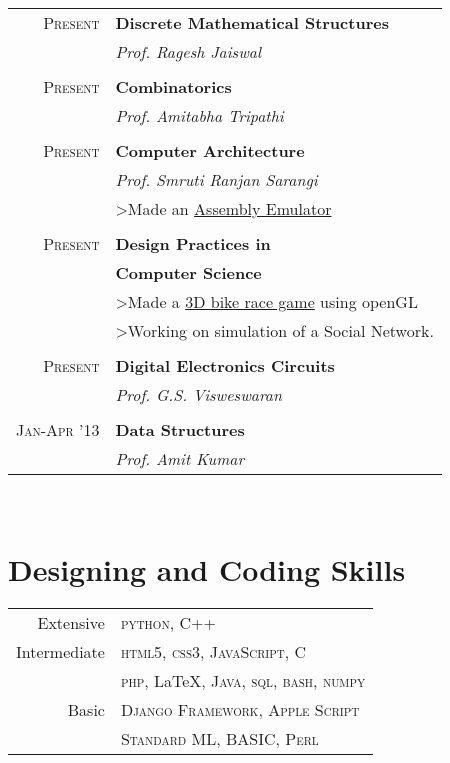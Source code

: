 \documentclass[10pt]{article} %
\begin{document}
{\begin{minipage}[t]{0.44\textwidth}
\begin{tabular}{rl}
\textsc{Present} & \textbf{Discrete Mathematical Structures}\\
& \textit{Prof. Ragesh Jaiswal}\\\\
\textsc{Present} & \textbf{Combinatorics}\\
& \textit{Prof. Amitabha Tripathi}\\\\
 \textsc{Present} & \textbf{Computer Architecture}\\
& \textit{Prof. Smruti Ranjan Sarangi}\\
& >Made an \href{https://github.com/knsn1994/simplerisc_emulator}{Assembly Emulator}\\\\
\textsc{Present} & \textbf{Design Practices in}\\ & \textbf{Computer Science}\\
&>Made a \href{https://github.com/knsn1994/HitchHiker-s-Rover--GAME-}{3D bike race game} using openGL \\ 
&>Working on simulation of a Social Network. \\ \\
 \textsc{Present} & \textbf{Digital Electronics Circuits}\\
& \textit{Prof. G.S. Visweswaran}\\\\
 \textsc{Jan-Apr '13} & \textbf{Data Structures}\\
& \textit{Prof. Amit Kumar}
\end{tabular}\\[10pt]


\section{Designing and Coding Skills} 

\begin{tabular}{rl}
Extensive
& \textsc{python}, C++\\[2pt]
Intermediate
& \textsc{html5}, \textsc{css3}, \textsc{JavaScript, C}\\ & \textsc{php}, \LaTeX, \textsc{Java, sql, bash, numpy}\\[2pt]
Basic
& \textsc{Django Framework, Apple Script}\\
& \textsc{Standard ML, BASIC, Perl}
\end{tabular}
\\


\end{minipage}}
\end{document}
